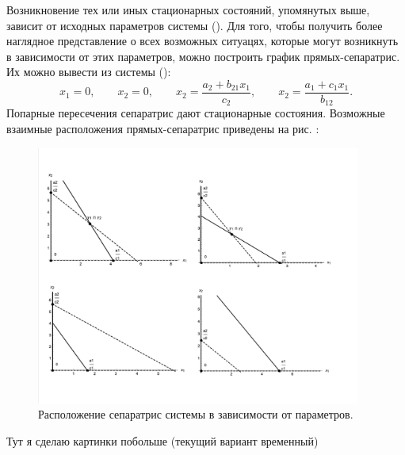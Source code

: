 \documentclass[12pt,a4paper]{article}
\begin{document}
    Возникновение тех или иных стационарных состояний, упомянутых выше, зависит от исходных параметров системы (). Для того, чтобы получить более наглядное представление о всех возможных ситуацях, которые могут возникнуть в зависимости от этих параметров, можно построить график \linebreak прямых-сепаратрис. Их можно вывести из системы ():
    \begin{equation}
        \label{nullclines}
            x_1 = 0,\qquad 
            x_2 = 0,\qquad
            x_2 = \dfrac{a_2 + b_{21} x_1}{c_2},\qquad 
            x_2 = \dfrac{a_1 + c_1 x_1}{b_{12}}.
    \end{equation}
    Попарные пересечения сепаратрис дают стационарные состояния. Возможные взаимные расположения прямых-сепаратрис приведены на рис. :
    \pagebreak
    \begin{figure}
        \centering
        \includegraphics[width=0.95\textwidth]{separatrises.pdf}
        \caption{Расположение сепаратрис системы в зависимости от параметров.}
        \label{fig:seps}
    \end{figure}

    Тут я сделаю картинки побольше (текущий вариант временный)

    \pagebreak
\end{document}

